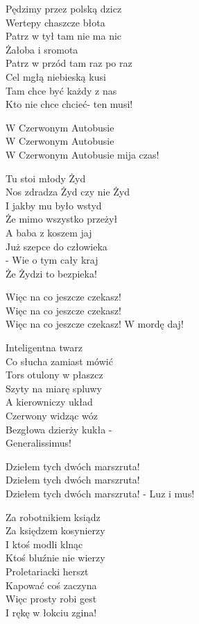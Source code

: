 \begin{text}
    Pędzimy przez polską dzicz\\
    Wertepy chaszcze błota\\
    Patrz w tył tam nie ma nic\\
    Żałoba i sromota\\
    Patrz w przód tam raz po raz\\
    Cel mgłą niebieską kusi\\
    Tam chce być każdy z nas\\
    Kto nie chce chcieć- ten musi!

    W Czerwonym Autobusie\\
    W Czerwonym Autobusie\\
    W Czerwonym Autobusie mija czas!

    Tu stoi młody Żyd\\
    Nos zdradza Żyd czy nie Żyd\\
    I jakby mu było wstyd\\
    Że mimo wszystko przeżył\\
    A baba z koszem jaj\\
    Już szepce do człowieka\\
    - Wie o tym cały kraj\\
    Że Żydzi to bezpieka!

    Więc na co jeszcze czekasz!\\
    Więc na co jeszcze czekasz!\\
    Więc na co jeszcze czekasz! W mordę daj!

    Inteligentna twarz\\
    Co słucha zamiast mówić\\
    Tors otulony w płaszcz\\
    Szyty na miarę spluwy\\
    A kierowniczy układ\\
    Czerwony widząc wóz\\
    Bezgłowa dzierży kukła -\\
    Generalissimus!

    Dziełem tych dwóch marszruta!\\
    Dziełem tych dwóch marszruta!\\
    Dziełem tych dwóch marszruta! - Luz i mus!

    Za robotnikiem ksiądz\\
    Za księdzem kosynierzy\\
    I ktoś modli klnąc\\
    Ktoś bluźnie nie wierzy\\
    Proletariacki herszt\\
    Kapować coś zaczyna\\
    Więc prosty robi gest\\
    I rękę w łokciu zgina!


\end{text}
